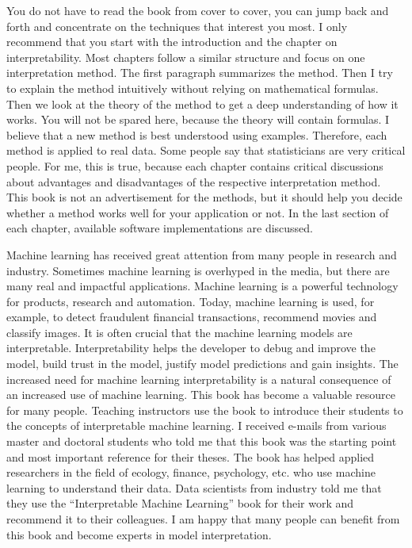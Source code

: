 \documentclass[
  11pt,
]{scrbook}
\begin{document}
You do not have to read the book from cover to cover, you can jump back and forth and concentrate on the techniques that interest you most.
I only recommend that you start with the introduction and the chapter on interpretability.
Most chapters follow a similar structure and focus on one interpretation method.
The first paragraph summarizes the method.
Then I try to explain the method intuitively without relying on mathematical formulas.
Then we look at the theory of the method to get a deep understanding of how it works.
You will not be spared here, because the theory will contain formulas.
I believe that a new method is best understood using examples.
Therefore, each method is applied to real data.
Some people say that statisticians are very critical people.
For me, this is true, because each chapter contains critical discussions about advantages and disadvantages of the respective interpretation method.
This book is not an advertisement for the methods, but it should help you decide whether a method works well for your application or not.
In the last section of each chapter, available software implementations are discussed.

Machine learning has received great attention from many people in research and industry.
Sometimes machine learning is overhyped in the media, but there are many real and impactful applications.
Machine learning is a powerful technology for products, research and automation.
Today, machine learning is used, for example, to detect fraudulent financial transactions, recommend movies and classify images.
It is often crucial that the machine learning models are interpretable.
Interpretability helps the developer to debug and improve the model, build trust in the model, justify model predictions and gain insights.
The increased need for machine learning interpretability is a natural consequence of an increased use of machine learning.
This book has become a valuable resource for many people.
Teaching instructors use the book to introduce their students to the concepts of interpretable machine learning.
I received e-mails from various master and doctoral students who told me that this book was the starting point and most important reference for their theses.
The book has helped applied researchers in the field of ecology, finance, psychology, etc. who use machine learning to understand their data.
Data scientists from industry told me that they use the ``Interpretable Machine Learning'' book for their work and recommend it to their colleagues.
I am happy that many people can benefit from this book and become experts in model interpretation.
\end{document}
